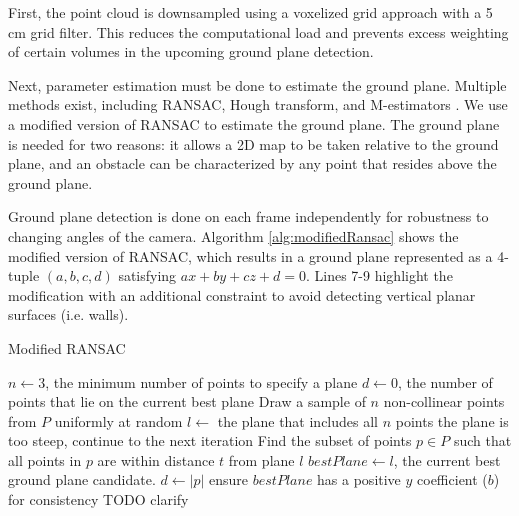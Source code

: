 
First, the point cloud is downsampled using a voxelized grid approach with a 5 cm
grid filter. This reduces the computational load and prevents excess weighting of
certain volumes in the upcoming ground plane detection.

Next, parameter estimation must be done to estimate the ground plane. Multiple methods
exist, including RANSAC, Hough transform, and M-estimators
\cite{holz2013towards}.
We use a modified version of RANSAC to estimate the ground plane. The
ground plane is needed for two reasons:
it allows a 2D map to be taken relative to the ground plane, and an obstacle can
be characterized by any point that resides above the ground plane.

Ground plane detection is done on each frame independently for robustness to
changing angles of the camera.
Algorithm \autoref{alg:modifiedRansac} shows the modified version of RANSAC,
which results in a ground plane represented as a 4-tuple $(a,b,c,d)$ satisfying
$ax + by + cz + d = 0$. Lines 7-9 highlight the modification with an additional
constraint to avoid detecting vertical planar surfaces (i.e. walls).


\begin{algorithm}
\caption{Modified RANSAC}
\label{alg:modifiedRansac}
\begin{algorithmic}[1]
\Statex
{}
    \State $n \gets 3$, the minimum number of points to specify a plane
    \State $d \gets 0$, the number of points that lie on the current best plane
        \State Draw a sample of $n$ non-collinear points from $P$ uniformly at random
        \State $l \gets$ the plane that includes all $n$ points
            \State the plane is too steep, continue to the next iteration
        \EndIf
        \State Find the subset of points $p \in P$ such that all points in $p$ are
        within distance $t$ from plane $l$
            \State $bestPlane \gets l$, the current best ground plane candidate.
            \State $d \gets |p|$
        \EndIf
    \EndFor
    \State ensure $bestPlane$ has a positive $y$ coefficient ($b$) for consistency TODO clarify
\EndFunction
\Statex
{}
\end{algorithmic}
\end{algorithm}

